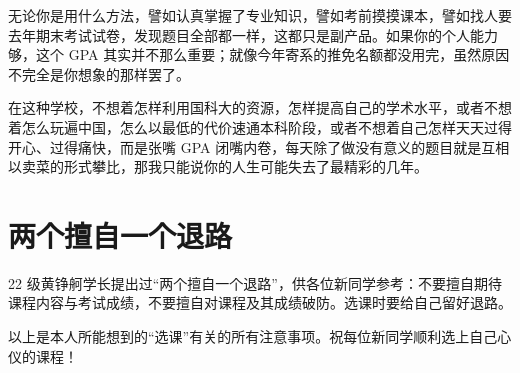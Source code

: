无论你是用什么方法，譬如认真掌握了专业知识，譬如考前摸摸课本，譬如找人要去年期末考试试卷，发现题目全部都一样，这都只是副产品。如果你的个人能力够，这个 GPA 其实并不那么重要；就像今年寄系的推免名额都没用完，虽然原因不完全是你想象的那样罢了。

在这种学校，不想着怎样利用国科大的资源，怎样提高自己的学术水平，或者不想着怎么玩遍中国，怎么以最低的代价速通本科阶段，或者不想着自己怎样天天过得开心、过得痛快，而是张嘴 GPA 闭嘴内卷，每天除了做没有意义的题目就是互相以卖菜的形式攀比，那我只能说你的人生可能失去了最精彩的几年。

\section{两个擅自一个退路}

22 级黄铮舸学长提出过“两个擅自一个退路”，供各位新同学参考：不要擅自期待课程内容与考试成绩，不要擅自对课程及其成绩破防。选课时要给自己留好退路。

以上是本人所能想到的“选课”有关的所有注意事项。祝每位新同学顺利选上自己心仪的课程！
